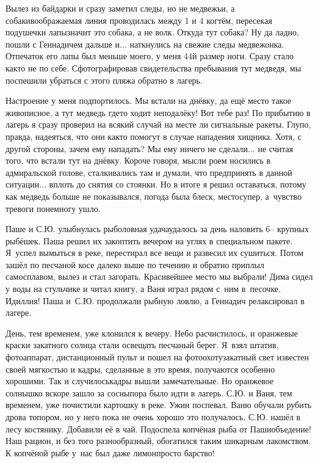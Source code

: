Вылез из байдарки и сразу заметил следы, но не медвежьи, а собаки\mdash воображаемая линия проводилась между 1 и 4 когтём, пересекая подушечки лапы\mdash значит это собака, а не волк. Откуда тут собака? Ну да ладно, пошли с Геннадичем дальше и$\ldots$ наткнулись на свежие следы медвежонка. Отпечаток его лапы был меньше моего, у меня 44\sdash й размер ноги. Сразу стало как\sdash то не по себе. Сфотографировав свидетельства пребывания тут медведя, мы поспешили убраться с этого пляжа обратно в лагерь. 

Настроение у меня подпортилось. Мы встали на днёвку, да ещё место такое живописное, а тут медведь где\sdash то ходит неподалёку! Вот тебе раз! По прибытию в лагерь я сразу проверил на всякий случай на месте ли сигнальные ракеты. Глупо, правда, надеяться, что они как\sdash то помогут в случае нападения хищника. Хотя, с другой стороны, зачем ему нападать? Мы ему ничего не сделали$\ldots$ не считая того, что встали тут на днёвку. Короче говоря, мысли роем носились в адмиральской голове, сталкивались там и думали, что предпринять в данной ситуации$\ldots$ вплоть до снятия со стоянки. Но в итоге я решил оставаться, потому как медведь больше не показывался, погода была блеск, место\mdash супер, а~чувство тревоги понемногу ушло. 

Паше и С.Ю. улыбнулась рыболовная удача\mdash удалось за день наловить 6\thinspace\nobreakdash-- крупных рыбёшек. Паша решил их закоптить вечером на углях в специальном пакете. Я~успел вымыться в реке, перестирал все вещи и развесил их сушиться. Потом зашёл по песчаной косе далеко выше по течению и обратно приплыл самосплавом, вылез и стал загорать. Красивейшее место мы выбрали! Дима сидел у воды на стульчике и читал книгу, а Ваня играл рядом с~ним в~песочке. Идиллия! Паша и~С.Ю. продолжали рыбную ловлю, а Геннадич релаксировал в лагере.

День, тем временем, уже клонился к вечеру. Небо расчистилось, и оранжевые краски закатного солнца стали освещать песчаный берег. Я~взял штатив, фотоаппарат, дистанционный пульт и пошел на фотоохоту\mdash закатный свет известен своей мягкостью и кадры, сделанные в это время, получаются особенно хорошими. Так и случилось\mdash кадры вышли замечательные. Но оранжевое солнышко вскоре зашло за сосны\mdash пора было идти в лагерь. С.Ю. и Ваня, тем временем, уже почистили картошку в реке. Ужин поспевал. Ваню обучали рубить дрова топором, но у него пока не очень хорошо это получалось. С.Ю. нашёл в лесу костянику. Добавили её в чай. Подоспела копчёная рыба от Паши\mdash объедение! Наш рацион, и без того разнообразный, обогатился таким шикарным лакомством. К копчёной рыбе у~нас был даже лимон\mdash просто барство! 

